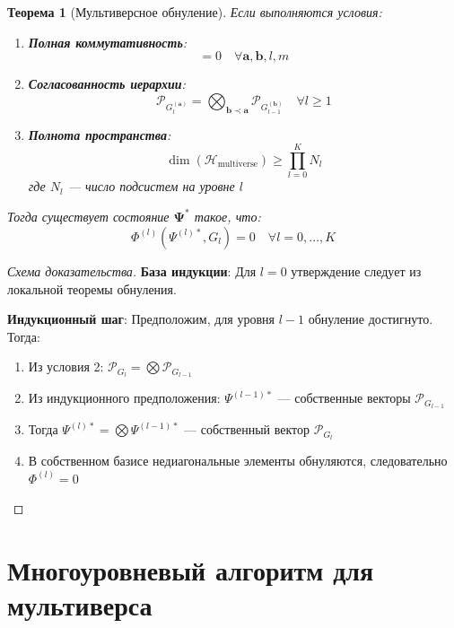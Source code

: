 \documentclass[12pt,a4paper]{article}
\newtheorem{theorem}{Теорема}[section]
\newcommand{\calH}{\mathcal{H}}
\newcommand{\calP}{\mathcal{P}}
\newcommand{\bfPsi}{\mathbf{\Psi}}
\newcommand{\bfa}{\mathbf{a}}
\newcommand{\bfb}{\mathbf{b}}
\newcommand{\PhiFunc}{\Phi}
\begin{document}
\begin{theorem}[Мультиверсное обнуление]
Если выполняются условия:
\begin{enumerate}
    \item \textbf{Полная коммутативность}:
    \begin{equation}
    [\calP_{G_l^{(\bfa)}}, \calP_{G_m^{(\bfb)}}] = 0 \quad \forall \bfa,\bfb, l,m
    \end{equation}
    
    \item \textbf{Согласованность иерархии}:
    \begin{equation}
    \calP_{G_l^{(\bfa)}} = \bigotimes_{\bfb \prec \bfa} \calP_{G_{l-1}^{(\bfb)}} \quad \forall l \geq 1
    \end{equation}
    
    \item \textbf{Полнота пространства}:
    \begin{equation}
    \dim(\calH_{\text{multiverse}}) \geq \prod_{l=0}^K N_l
    \end{equation}
    где $N_l$ --- число подсистем на уровне $l$
\end{enumerate}

Тогда существует состояние $\bfPsi^*$ такое, что:
\begin{equation}
\PhiFunc^{(l)}(\Psi^{(l)*}, G_l) = 0 \quad \forall l = 0, \dots, K
\end{equation}
\end{theorem}

\begin{proof}[Схема доказательства]
\textbf{База индукции}: Для $l=0$ утверждение следует из локальной теоремы обнуления.

\textbf{Индукционный шаг}: Предположим, для уровня $l-1$ обнуление достигнуто. Тогда:
\begin{enumerate}
    \item Из условия 2: $\calP_{G_l} = \bigotimes \calP_{G_{l-1}}$
    \item Из индукционного предположения: $\Psi^{(l-1)*}$ --- собственные векторы $\calP_{G_{l-1}}$
    \item Тогда $\Psi^{(l)*} = \bigotimes \Psi^{(l-1)*}$ --- собственный вектор $\calP_{G_l}$
    \item В собственном базисе недиагональные элементы обнуляются, следовательно $\PhiFunc^{(l)} = 0$
\end{enumerate}
\end{proof}

\section{Многоуровневый алгоритм для мультиверса}
\end{document}
